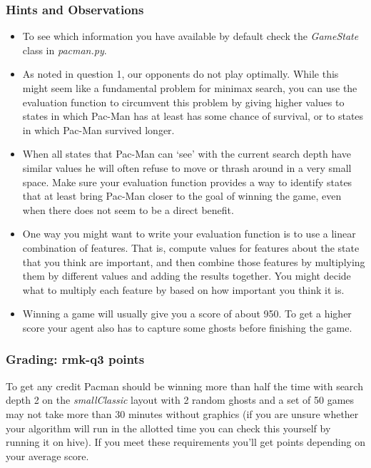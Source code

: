 \documentclass{article}
\newcommand{\points}[1]{\csname rmk-#1\endcsname}
\begin{document}
\subsubsection{Hints and Observations}

\begin{itemize}
\item To see which information you have available by default check the \emph{GameState} class in \emph{pacman.py}.

\item As noted in question 1, our opponents do not play optimally. While this might seem like a fundamental problem for minimax search, you can use the evaluation function to circumvent this problem by giving higher values to states in which Pac-Man has at least has some chance of survival, or to states in which Pac-Man survived longer.

\item When all states that Pac-Man can `see' with the current search depth have similar values he will often refuse to move or thrash around in a very small space. Make sure your evaluation function provides a way to identify states that at least bring Pac-Man closer to the goal of winning the game, even when there does not seem to be a direct benefit. 

\item One way you might want to write your evaluation function is to use a linear combination of features. That is, compute values for features about the state that you think are important, and then combine those features by multiplying them by different values and adding the results together. You might decide what to multiply each feature by based on how important you think it is.

\item Winning a game will usually give you a score of about 950. To get a higher score your agent also has to capture some ghosts before finishing the game.
\end{itemize}

\subsubsection{Grading: \points{q3} points}
To get any credit Pacman should be winning more than half the time with search depth 2 on the \emph{smallClassic} layout with 2 random ghosts and a set of 50 games may not take more than 30 minutes without graphics (if you are unsure whether your algorithm will run in the allotted time you can check this yourself by running it on hive). If you meet these requirements you'll get points depending on your average score.
\end{document}
